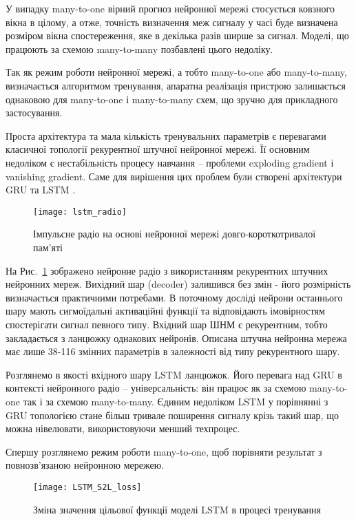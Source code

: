 У випадку many-to-one вірний прогноз нейронної мережі стосується ковзного 
вікна в цілому, а отже, точність визначення меж сигналу у часі буде визначена 
розміром вікна спостереження, яке в декілька разів ширше за сигнал. Моделі, 
що працюють за схемою many-to-many позбавлені цього недоліку.

Так як режим роботи нейронної мережі, а тобто many-to-one або many-to-many,
визначається алгоритмом тренування, апаратна реалізація пристрою залишається 
однаковою для many-to-one і many-to-many схем, що зручно для прикладного 
застосування.

Проста архітектура та мала кількість тренувальних параметрів є 
перевагами класичної топології рекурентної штучної нейронної мережі.
Її основним недоліком є нестабільність процесу навчання -- проблеми 
exploding gradient і vanishing gradient. Саме для вирішення цих проблем 
були створені архітектури GRU та LSTM \cite{imp:Hochreiter1997}.

\begin{figure}[htbp] \begin{center}
\texttt{[image: lstm\_radio]}
\caption{Імпульсне радіо на основі нейронної мережі 
довго-короткотривалої пам'яті} \label{fig:lstm_radio}
\end{center} \end{figure}

На Рис.~\ref{fig:lstm_radio} зображено нейронне радіо з використанням 
рекурентних штучних нейронних мереж. Вихідний шар (decoder) залишився без 
змін - його розмірність визначається практичними потребами. В поточному 
досліді нейрони останнього шару мають сигмоїдальні активаційні функції 
та відповідають імовірностям спостерігати сигнал певного типу. Вхідний 
шар ШНМ є рекурентним, тобто закладається з ланцюжку однакових нейронів.
Описана штучна нейронна мережа має лише 38-116 змінних параметрів в 
залежності від типу рекурентного шару.

Розглянемо в якості вхідного шару LSTM ланцюжок. Його перевага над 
GRU в контексті нейронного радіо -- універсальність: він працює як за схемою
many-to-one так і за схемою many-to-many. Єдиним недоліком LSTM у порівнянні 
з GRU топологією стане більш тривале поширення сигналу крізь такий шар,
що можна нівелювати, використовуючи менший техпроцес.

Спершу розглянемо режим роботи many-to-one, щоб порівняти результат з 
повнозв'язаною нейронною мережею.

\begin{figure}[htbp] \begin{center}
\texttt{[image: LSTM\_S2L\_loss]}
\caption{Зміна значення цільової функції моделі LSTM 
в процесі тренування} \label{fig:lstm_loss}
\end{center} \end{figure}

